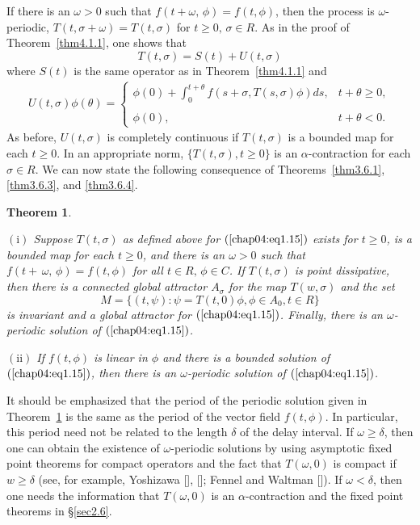 \documentclass{surv-l}
\theoremstyle{plain}
\newtheorem{theorem}{Theorem}[section]
\theoremstyle{definition}
\numberwithin{equation}{section}
\numberwithin{figure}{chapter}
\begin{document}
If there is an $\omega >0$ such that $f(t+\omega,\,\phi)=f(t, \phi)$, then the process is
$\omega$-periodic, $T(t, \sigma+\omega)=T(t, \sigma)$ for $t\geq 0,\,\sigma\in R$. As in the proof of Theorem~\ref{thm4.1.1}, one shows that
\begin{equation*}
T(t, \sigma)=S(t)+U(t, \sigma)
\end{equation*}
where $S(t)$ is the same operator as in Theorem~\ref{thm4.1.1} and
\begin{align*}
U(t, \sigma)\phi(\theta)=\left\{\begin{array}{ll}
\phi(0)+\displaystyle\int_{0}^{t+\theta}f(s+\sigma, T(s, \sigma)\phi) ds, & t+\theta\geq 0,\\
\\
\phi(0), & t+\theta<0.
\end{array}\right.
\end{align*}
As before, $U(t, \sigma)$ is completely continuous if $T(t, \sigma)$ is a bounded map for each $t\geq 0$. In an appropriate norm, $\{T(t, \sigma), t\geq 0\}$ is an $\alpha$-contraction for each $\sigma\in R$. We can now state the following consequence of Theorems~\ref{thm3.6.1}, \ref{thm3.6.3}, and \ref{thm3.6.4}.

\begin{theorem}\label{thm4.1.11}\

$\mathrm{(i)}$ Suppose $T(t, \sigma)$ as defined above for $(\ref{chap04:eq1.15})$ exists for $t\geq 0$, is a bounded map for each $t\geq 0$, and there is an $\omega >0$ such that $f(t+\, \omega,\, \phi)=f(t, \phi)$ for all $t \in R,\,\phi\in C$. If $T(t, \sigma)$ is point dissipative, then there is a connected global attractor $A_{\sigma}$ for the map $T(w, \sigma)$ and the set
\begin{equation*}
M=\{(t, \psi)\!:\psi=T(t, 0)\phi, \phi \in A_{0}, t\in R\}
\end{equation*}
is invariant and a global attractor for $(\ref{chap04:eq1.15})$. Finally, there is an $\omega$-periodic solution of $(\ref{chap04:eq1.15})$.

$\mathrm{(ii)}$ If $f(t, \phi)$ is linear in $\phi$ and there is a bounded solution of $(\ref{chap04:eq1.15})$, then there is an $\omega$-periodic solution of $(\ref{chap04:eq1.15})$.
\end{theorem}

It should be emphasized that the period of the periodic solution given in Theorem~\ref{thm4.1.11} is the same as the period of the vector field $f(t, \phi)$. In particular, this period need not be related to the length $\delta$ of the delay interval. If $\omega \geq\delta$, then one can obtain the existence of $\omega$-periodic solutions by using asymptotic fixed point theorems for compact operators and the fact that $T(\omega, 0)$ is compact if $w \geq\delta$ (see, for example, Yoshizawa [\citeyear{1966y}], [\citeyear{1975y}]; Fennel and Waltman [\citeyear{1969fw}]). If $\omega <\delta$, then one needs the information that $T(\omega, 0)$ is an $\alpha$-contraction and the fixed point theorems in \S\ref{sec2.6}.
\end{document}
